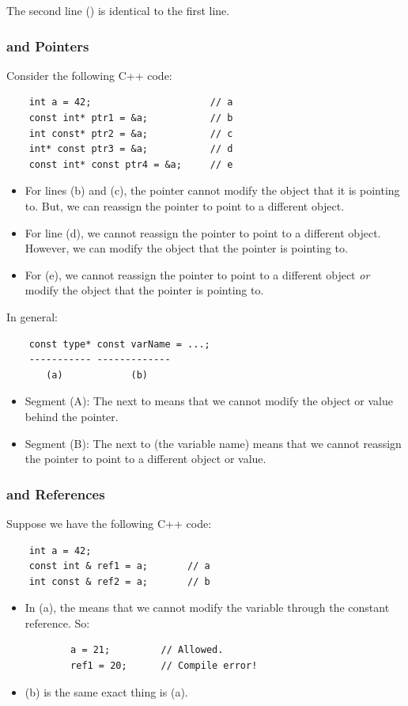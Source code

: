\documentclass[letterpaper]{article}
\begin{document}
\bigskip

The second line () is identical to the first line. 


\subsubsection{ and Pointers}
Consider the following C++ code: 
\begin{verbatim}
    int a = 42;                     // a 
    const int* ptr1 = &a;           // b
    int const* ptr2 = &a;           // c
    int* const ptr3 = &a;           // d
    const int* const ptr4 = &a;     // e
\end{verbatim}
\begin{itemize}
    \item For lines (b) and (c), the pointer cannot modify the object that it is pointing to.  But, we can reassign the pointer to point to a different object. 
    \item For line (d), we cannot reassign the pointer to point to a different object. However, we can modify the object that the pointer is pointing to. 
    \item For (e), we cannot reassign the pointer to point to a different object \emph{or} modify the object that the pointer is pointing to. 
\end{itemize}
In general:
\begin{verbatim}
    const type* const varName = ...; 
    ----------- -------------
       (a)            (b)
\end{verbatim}
\begin{itemize}
    \item Segment (A): The  next to  means that we cannot modify the object or value behind the pointer. 
    \item Segment (B): The  next to  (the variable name) means that we cannot reassign the pointer to point to a different object or value. 
\end{itemize}

\subsubsection{ and References}
Suppose we have the following C++ code: 
\begin{verbatim}
    int a = 42; 
    const int & ref1 = a;       // a
    int const & ref2 = a;       // b
\end{verbatim}
\begin{itemize}
    \item In (a), the  means that we cannot modify the variable through the constant reference. So: 
    \begin{verbatim}
        a = 21;         // Allowed. 
        ref1 = 20;      // Compile error!
    \end{verbatim}

    \item (b) is the same exact thing is (a).
\end{itemize}
\end{document}
